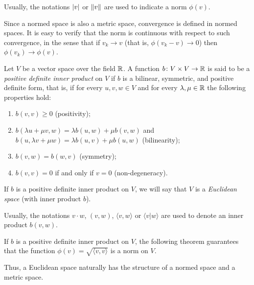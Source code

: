 Usually, the notations ${\left|v\right|}$ or ${\left\Vert v\right\Vert}$ are used to indicate
a norm $\phi(v)$.

Since a normed space is also a metric space, convergence is defined in normed
spaces. It is easy to verify that the norm is continuous with respect to such
convergence, in the sense that if $v_k \to v$
(that is, $\phi(v_k-v)\to 0$) then $\phi(v_k)\to \phi(v)$.

\begin{definition}
\label{def:prodotto_scalare}%
Let $V$ be a vector space over the field ${\mathbb R}$.
A function $b\colon V\times V \to {\mathbb R}$ is said to be a \emph{positive definite
inner product}%
%
%
on $V$ if
$b$ is a bilinear, symmetric, and positive definite form, that is, if
for every $u,v,w\in V$ and for every $\lambda, \mu \in {\mathbb R}$
the following properties hold:
\begin{enumerate}
\item $b(v,v) \ge 0$ (positivity);
\item $b(\lambda u + \mu v, w) = \lambda b(u,w) + \mu b(v,w)$
and $b(u,\lambda v+ \mu w) = \lambda b(u,v) + \mu b(u,w)$
(bilinearity);
\item $b(v,w) = b(w,v)$ (symmetry);
\item $b(v,v) = 0$ if and only if $v=0$ (non-degeneracy).
\end{enumerate}

If $b$ is a positive definite inner product on $V$, we will say that $V$ is a
\emph{Euclidean space} (with inner product $b$).

Usually, the notations $v\cdot w$, $(v,w)$, $\langle v,w\rangle$
or $\langle v \vert w\rangle$ are used to denote an inner product $b(v,w)$.
\end{definition}

If $b$ is a positive definite inner product on $V$, the following theorem
guarantees that
the function $\phi(v) = \sqrt{\langle v,v\rangle}$ is a norm on $V$.

Thus, a Euclidean space naturally has the structure of a normed space and a
metric space.

